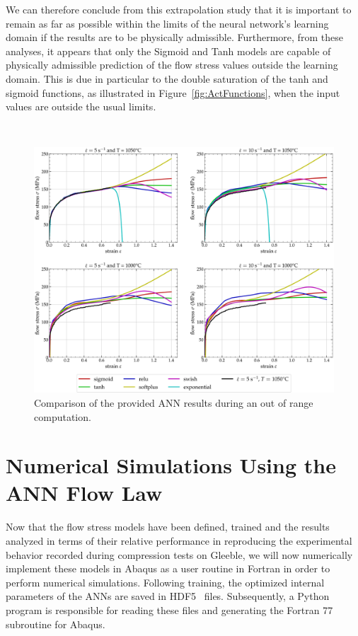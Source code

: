 \documentclass[algorithms,article,accept,pdftex,oneauthor]{Definitions/mdpi}
\begin{document}
We can therefore conclude from this extrapolation study that it is important to remain as far as possible within the limits of the neural network's learning domain if the results are to be physically admissible.
Furthermore, from these analyses, it appears that only the Sigmoid and Tanh models are capable of physically admissible prediction of the flow stress values outside the learning domain.
This is due in particular to the double saturation of the tanh and sigmoid functions, as illustrated in Figure~\ref{fig:ActFunctions}, when the input values are outside the usual limits.

\begin{figure}[H]
\

\includegraphics[width=0.97\columnwidth]{Figures/Extrapolation}
\caption{Comparison of the provided ANN results during an out of range computation.}
\label{fig:ANN-Extrapolation}
\end{figure}




\section{Numerical Simulations Using the ANN Flow Law}\label{sec:Numerical}

Now that the flow stress models have been defined, trained and the results analyzed in terms of their relative performance in reproducing the experimental behavior recorded during compression tests on Gleeble, we will now numerically implement these models in Abaqus as a user routine in Fortran in order to perform numerical simulations.
Following training, the optimized internal parameters of the ANNs are saved in HDF5~\cite{Koranne-2011-HDF} files.
Subsequently, a Python program is responsible for reading these files and generating the Fortran 77 subroutine for Abaqus.
\end{document}
